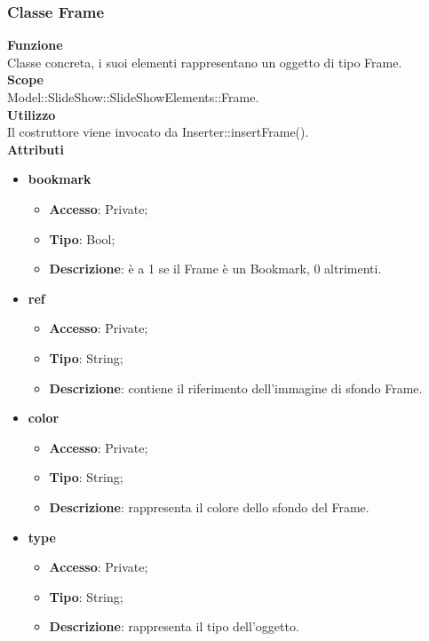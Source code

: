 {	\subsubsection{Classe Frame}{
		\label{Frame}
		\textbf{Funzione}\\
			\indent Classe concreta, i suoi elementi rappresentano un oggetto di tipo Frame.\\
	   	\textbf{Scope}\\
			\indent Model::SlideShow::SlideShowElements::Frame.\\
		\textbf{Utilizzo}\\
			\indent Il costruttore viene invocato da Inserter::insertFrame().\\
		\textbf{Attributi}
		\begin{itemize}
			\item \textbf{bookmark}
			\begin{itemize}
				\item \textbf{Accesso}: Private;
				\item \textbf{Tipo}: Bool;
				\item \textbf{Descrizione}: è a 1 se il Frame\ped{g} è un Bookmark, 0 altrimenti.
			\end{itemize}
			\item \textbf{ref}
			\begin{itemize}
				\item \textbf{Accesso}: Private;
				\item \textbf{Tipo}: String;
				\item \textbf{Descrizione}: contiene il riferimento dell’immagine di sfondo Frame.
			\end{itemize}
			\item \textbf{color}
			\begin{itemize}
				\item \textbf{Accesso}: Private;
				\item \textbf{Tipo}: String;
				\item \textbf{Descrizione}: rappresenta il colore dello sfondo del Frame.
			\end{itemize}
			\item \textbf{type}
			\begin{itemize}
				\item \textbf{Accesso}: Private;
				\item \textbf{Tipo}: String;
				\item \textbf{Descrizione}: rappresenta il tipo dell'oggetto.
			\end{itemize}
		\end{itemize}
		}
}
